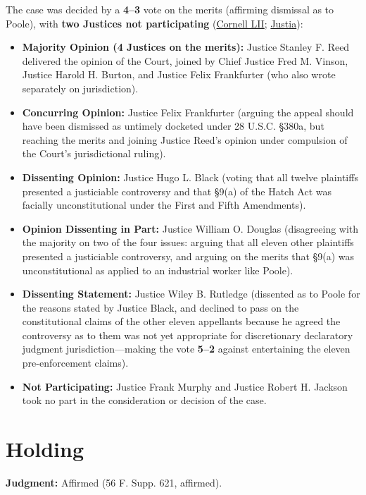 \documentclass[12pt]{article}
\begin{document}
The case was decided by a \textbf{4--3} vote on the merits (affirming dismissal as to Poole), with \textbf{two Justices not participating} (\href{https://www.law.cornell.edu/supremecourt/text/330/75}{Cornell LII}; \href{https://supreme.justia.com/cases/federal/us/330/75/}{Justia}):
\begin{itemize}
\item \textbf{Majority Opinion (4 Justices on the merits):} Justice Stanley F. Reed delivered the opinion of the Court, joined by Chief Justice Fred M. Vinson, Justice Harold H. Burton, and Justice Felix Frankfurter (who also wrote separately on jurisdiction).
\item \textbf{Concurring Opinion:} Justice Felix Frankfurter (arguing the appeal should have been dismissed as untimely docketed under 28 U.S.C. \S 380a, but reaching the merits and joining Justice Reed's opinion under compulsion of the Court's jurisdictional ruling).
\item \textbf{Dissenting Opinion:} Justice Hugo L. Black (voting that all twelve plaintiffs presented a justiciable controversy and that \S 9(a) of the Hatch Act was facially unconstitutional under the First and Fifth Amendments).
\item \textbf{Opinion Dissenting in Part:} Justice William O. Douglas (disagreeing with the majority on two of the four issues: arguing that all eleven other plaintiffs presented a justiciable controversy, and arguing on the merits that \S 9(a) was unconstitutional as applied to an industrial worker like Poole).
\item \textbf{Dissenting Statement:} Justice Wiley B. Rutledge (dissented as to Poole for the reasons stated by Justice Black, and declined to pass on the constitutional claims of the other eleven appellants because he agreed the controversy as to them was not yet appropriate for discretionary declaratory judgment jurisdiction---making the vote \textbf{5--2} against entertaining the eleven pre-enforcement claims).
\item \textbf{Not Participating:} Justice Frank Murphy and Justice Robert H. Jackson took no part in the consideration or decision of the case.
\end{itemize}

\section{Holding}

\textbf{Judgment:} Affirmed (56 F. Supp. 621, affirmed).
\end{document}
